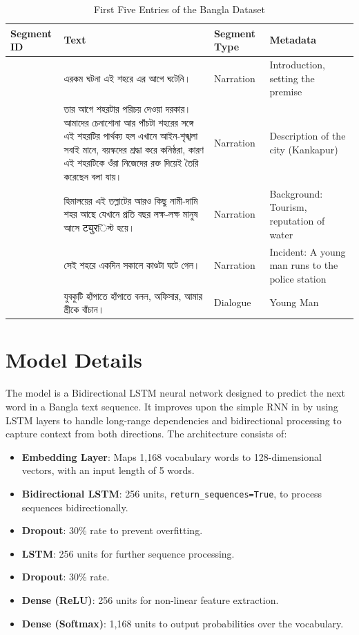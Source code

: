 \documentclass[12pt]{article}
\begin{document}
\begin{table}[H]
\centering
\caption{First Five Entries of the Bangla Dataset}
\label{tab:dataset_sample}
\begin{tabular}{|>{\raggedright\arraybackslash}p{1.5cm}|>{\raggedright\arraybackslash}p{6cm}|>{\raggedright\arraybackslash}p{2cm}|>{\raggedright\arraybackslash}p{3cm}|}
\hline
\textbf{Segment ID} & \textbf{Text} & \textbf{Segment Type} & \textbf{Metadata} \\
\hline
1 & {\bengalifont এরকম ঘটনা এই শহরে এর আগে ঘটেনি।} & Narration & Introduction, setting the premise \\
\hline
2 & {\bengalifont তার আগে শহরটার পরিচয় দেওয়া দরকার। আমাদের চেনাশোনা আর পাঁচটা শহরের সঙ্গে এই শহরটির পার্থক্য হল এখানে আইন-শৃঙ্খলা সবাই মানে, বয়স্কদের শ্রদ্ধা করে কনিষ্ঠরা, কারণ এই শহরটিকে ওঁরা নিজেদের রক্ত দিয়েই তৈরি করেছেন বলা যায়।} & Narration & Description of the city (Kankapur) \\
\hline
3 & {\bengalifont হিমালয়ের এই তল্লাটের আরও কিছু নামী-দামি শহর আছে যেখানে প্রতি বছর লক্ষ-লক্ষ মানুষ আসে ट्युरিস্ট হয়ে।} & Narration & Background: Tourism, reputation of water \\
\hline
4 & {\bengalifont সেই শহরে একদিন সকালে কাণ্ডটা ঘটে গেল।} & Narration & Incident: A young man runs to the police station \\
\hline
5 & {\bengalifont যুবকুটি হাঁপাতে হাঁপাতে বলল, অফিসার, আমার স্ত্রীকে বাঁচান।} & Dialogue & Young Man \\
\hline
\end{tabular}
\end{table}

\section{Model Details}
The model is a Bidirectional LSTM neural network designed to predict the next word in a Bangla text sequence. It improves upon the simple RNN in \cite{singh2024} by using LSTM layers to handle long-range dependencies and bidirectional processing to capture context from both directions. The architecture consists of:

\begin{itemize}
    \item \textbf{Embedding Layer}: Maps 1,168 vocabulary words to 128-dimensional vectors, with an input length of 5 words.
    \item \textbf{Bidirectional LSTM}: 256 units, \texttt{return\_sequences=True}, to process sequences bidirectionally.
    \item \textbf{Dropout}: 30\% rate to prevent overfitting.
    \item \textbf{LSTM}: 256 units for further sequence processing.
    \item \textbf{Dropout}: 30\% rate.
    \item \textbf{Dense (ReLU)}: 256 units for non-linear feature extraction.
    \item \textbf{Dense (Softmax)}: 1,168 units to output probabilities over the vocabulary.
\end{itemize}
\end{document}
